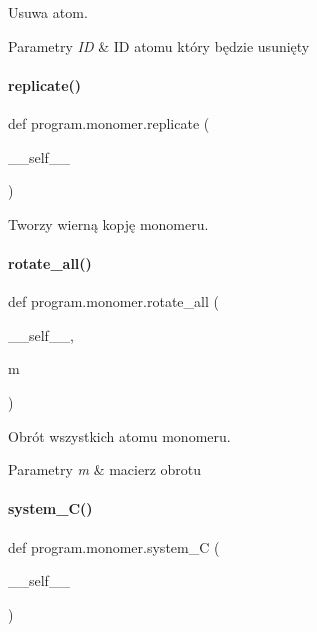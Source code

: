 Usuwa atom. 


\begin{DoxyParams}{Parametry}
{\em ID} & ID atomu który będzie usunięty \\
\hline
\end{DoxyParams}
\mbox{\label{classprogram_1_1monomer_a7b20019215ea0e231ecbf09003c5924d}} 
\paragraph{replicate()}
{\footnotesize\ttfamily def program.\+monomer.\+replicate (\begin{DoxyParamCaption}\item[{}]{\+\_\+\+\_\+self\+\_\+\+\_\+ }\end{DoxyParamCaption})}



Tworzy wierną kopję monomeru. 

\mbox{\label{classprogram_1_1monomer_ab2aa195faf2f4df60084d3d4b766641e}} 
\paragraph{rotate\+\_\+all()}
{\footnotesize\ttfamily def program.\+monomer.\+rotate\+\_\+all (\begin{DoxyParamCaption}\item[{}]{\+\_\+\+\_\+self\+\_\+\+\_\+,  }\item[{}]{m }\end{DoxyParamCaption})}



Obrót wszystkich atomu monomeru. 


\begin{DoxyParams}{Parametry}
{\em m} & macierz obrotu \\
\hline
\end{DoxyParams}
\mbox{\label{classprogram_1_1monomer_a7d031a870249054f59c6a85b270b97a4}} 
\paragraph{system\+\_\+\+C()}
{\footnotesize\ttfamily def program.\+monomer.\+system\+\_\+C (\begin{DoxyParamCaption}\item[{}]{\+\_\+\+\_\+self\+\_\+\+\_\+ }\end{DoxyParamCaption})}



